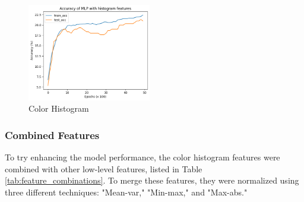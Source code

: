 \documentclass{article}
\begin{document}
\begin{multicols}{2}
    \begin{figure}[H]
        \centering
        \includegraphics[width=0.48\textwidth]{color_hist.png}
        \caption{Color Histogram}
        \label{fig:color_hist}
    \end{figure}



\subsubsection{Combined Features}
To try enhancing the model performance, the color histogram features were combined with other low-level features, listed in Table \ref{tab:feature_combinations}. 
To merge these features, they were normalized using three different techniques: "Mean-var," "Min-max," and "Max-abs." 


\end{multicols}
\end{document}
